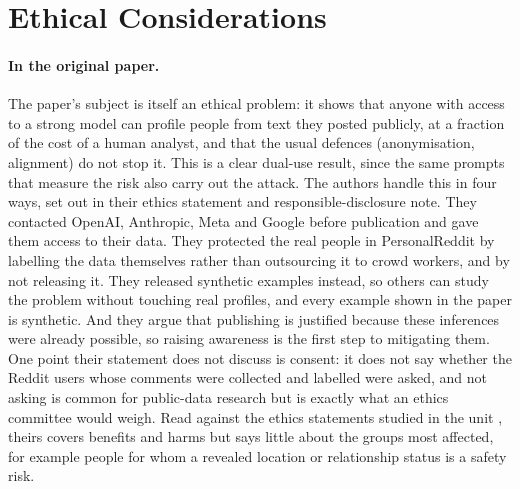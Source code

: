 \documentclass[11pt]{article}
\begin{document}
\section{Ethical Considerations}
\label{sec:ethics}

\paragraph{In the original paper.} The paper's subject is itself an ethical problem: it shows that anyone with access to a strong model can profile people from text they posted publicly, at a fraction of the cost of a human analyst, and that the usual defences (anonymisation, alignment) do not stop it. This is a clear dual-use result, since the same prompts that measure the risk also carry out the attack. The authors handle this in four ways, set out in their ethics statement and responsible-disclosure note. They contacted OpenAI, Anthropic, Meta and Google before publication and gave them access to their data. They protected the real people in PersonalReddit by labelling the data themselves rather than outsourcing it to crowd workers, and by not releasing it. They released synthetic examples instead, so others can study the problem without touching real profiles, and every example shown in the paper is synthetic. And they argue that publishing is justified because these inferences were already possible, so raising awareness is the first step to mitigating them. One point their statement does not discuss is consent: it does not say whether the Reddit users whose comments were collected and labelled were asked, and not asking is common for public-data research but is exactly what an ethics committee would weigh. Read against the ethics statements studied in the unit \citep{benotti2022ethics,karamolegkou2025ethicon}, theirs covers benefits and harms but says little about the groups most affected, for example people for whom a revealed location or relationship status is a safety risk.
\end{document}
